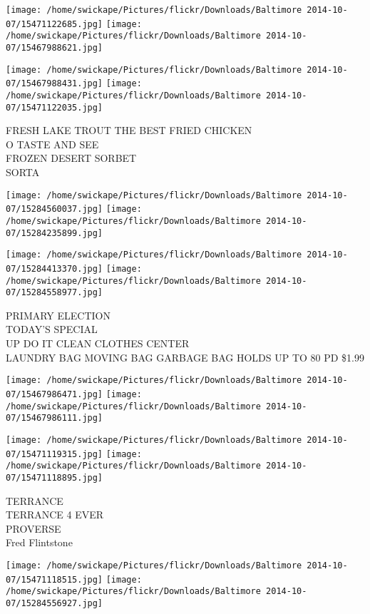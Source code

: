 \documentclass[10pt,letterpaper]{article}
\begin{document}
\texttt{[image: /home/swickape/Pictures/flickr/Downloads/Baltimore 2014-10-07/15471122685.jpg]}
\texttt{[image: /home/swickape/Pictures/flickr/Downloads/Baltimore 2014-10-07/15467988621.jpg]}

\texttt{[image: /home/swickape/Pictures/flickr/Downloads/Baltimore 2014-10-07/15467988431.jpg]}
\texttt{[image: /home/swickape/Pictures/flickr/Downloads/Baltimore 2014-10-07/15471122035.jpg]}

FRESH LAKE TROUT THE BEST FRIED CHICKEN\\
O TASTE AND SEE\\
FROZEN DESERT SORBET\\
SORTA
\pagebreak

\texttt{[image: /home/swickape/Pictures/flickr/Downloads/Baltimore 2014-10-07/15284560037.jpg]}
\texttt{[image: /home/swickape/Pictures/flickr/Downloads/Baltimore 2014-10-07/15284235899.jpg]}

\texttt{[image: /home/swickape/Pictures/flickr/Downloads/Baltimore 2014-10-07/15284413370.jpg]}
\texttt{[image: /home/swickape/Pictures/flickr/Downloads/Baltimore 2014-10-07/15284558977.jpg]}

PRIMARY ELECTION\\
TODAY'S SPECIAL\\
UP DO IT CLEAN CLOTHES CENTER\\
LAUNDRY BAG MOVING BAG GARBAGE BAG HOLDS UP TO 80 PD \$1.99
\pagebreak

\texttt{[image: /home/swickape/Pictures/flickr/Downloads/Baltimore 2014-10-07/15467986471.jpg]}
\texttt{[image: /home/swickape/Pictures/flickr/Downloads/Baltimore 2014-10-07/15467986111.jpg]}

\texttt{[image: /home/swickape/Pictures/flickr/Downloads/Baltimore 2014-10-07/15471119315.jpg]}
\texttt{[image: /home/swickape/Pictures/flickr/Downloads/Baltimore 2014-10-07/15471118895.jpg]}

TERRANCE\\
TERRANCE 4 EVER\\
PROVERSE\\
Fred Flintstone
\pagebreak

\texttt{[image: /home/swickape/Pictures/flickr/Downloads/Baltimore 2014-10-07/15471118515.jpg]}
\texttt{[image: /home/swickape/Pictures/flickr/Downloads/Baltimore 2014-10-07/15284556927.jpg]}
\end{document}
